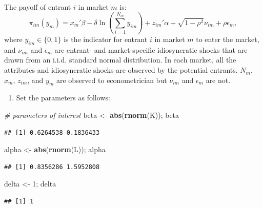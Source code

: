 \documentclass[]{book}
\newenvironment{Shaded}{\begin{snugshade}}{\end{snugshade}}
\newcommand{\KeywordTok}[1]{\textcolor[rgb]{0.13,0.29,0.53}{\textbf{#1}}}
\newcommand{\DecValTok}[1]{\textcolor[rgb]{0.00,0.00,0.81}{#1}}
\newcommand{\StringTok}[1]{\textcolor[rgb]{0.31,0.60,0.02}{#1}}
\newcommand{\CommentTok}[1]{\textcolor[rgb]{0.56,0.35,0.01}{\textit{#1}}}
\newcommand{\NormalTok}[1]{#1}
\providecommand{\tightlist}{%
  \setlength{\itemsep}{0pt}\setlength{\parskip}{0pt}}
\begin{document}
The payoff of entrant \(i\) in market \(m\) is: \[
\pi_{im}(y_m) = x_m'\beta - \delta \ln \left(\sum_{i = 1}^{N_m} y_{im}\right) + z_{im}'\alpha + \sqrt{1 - \rho^2} \nu_{im} + \rho \epsilon_{m},
\] where \(y_{im} \in \{0, 1\}\) is the indicator for entrant \(i\) in
market \(m\) to enter the market, and \(\nu_{im}\) and \(\epsilon_m\)
are entrant- and market-specific idiosyncratic shocks that are drawn
from an i.i.d. standard normal distribution. In each market, all the
attributes and idiosyncratic shocks are observed by the potential
entrants. \(N_m\), \(x_m\), \(z_{im}\), and \(y_m\) are observed to
econometrician but \(\nu_{im}\) and \(\epsilon_m\) are not.

\begin{enumerate}
\def\labelenumi{\arabic{enumi}.}
\setcounter{enumi}{1}
\tightlist
\item
  Set the parameters as follows:
\end{enumerate}

\begin{Shaded}
\begin{Highlighting}[]
\CommentTok{# parameters of interest}
\NormalTok{beta <-}\StringTok{ }\KeywordTok{abs}\NormalTok{(}\KeywordTok{rnorm}\NormalTok{(K)); beta}
\end{Highlighting}
\end{Shaded}

\begin{verbatim}
## [1] 0.6264538 0.1836433
\end{verbatim}

\begin{Shaded}
\begin{Highlighting}[]
\NormalTok{alpha <-}\StringTok{ }\KeywordTok{abs}\NormalTok{(}\KeywordTok{rnorm}\NormalTok{(L)); alpha}
\end{Highlighting}
\end{Shaded}

\begin{verbatim}
## [1] 0.8356286 1.5952808
\end{verbatim}

\begin{Shaded}
\begin{Highlighting}[]
\NormalTok{delta <-}\StringTok{ }\DecValTok{1}\NormalTok{; delta}
\end{Highlighting}
\end{Shaded}

\begin{verbatim}
## [1] 1
\end{verbatim}
\end{document}
